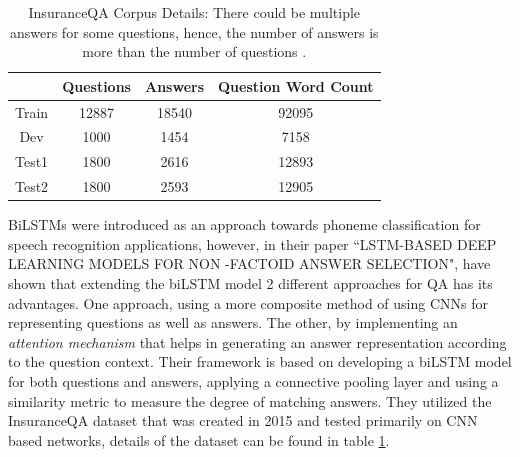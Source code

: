 \documentclass[a4paper,12pt]{report}
\begin{document}
             \begin{table}[h!]
              \centering
                \begin{tabular}{|c|c|c|c|}
                    \hline
                     & Questions & Answers & Question Word Count \\
                    \hline
                    Train & 12887 & 18540 & 92095 \\
                    \hline
                    Dev & 1000 & 1454& 7158 \\
                    \hline
                    Test1 & 1800 & 2616 & 12893 \\
                    \hline
                    Test2 & 1800 & 2593 & 12905 \\
                    \hline
                \end{tabular}
                \caption{InsuranceQA Corpus Details: There could be multiple answers for some questions, hence, the number of answers is more than the number of questions \citep{lstmInsuranceQA}.}\label{lstmInsuranceQATable}
            \end{table}

            BiLSTMs were introduced as an approach towards phoneme classification for speech recognition applications, however, in their paper ``LSTM-BASED DEEP LEARNING MODELS FOR NON -FACTOID ANSWER SELECTION", \citep{lstmhaighextractive} have shown that extending the biLSTM model 2 different approaches for QA has its advantages. One approach, using a more composite method of using CNNs for representing questions as well as answers. The other, by implementing an \textit{attention mechanism} that helps in generating an answer representation according to the question context.
            Their framework is based on developing a biLSTM model for both questions and answers, applying a connective pooling layer and using a similarity metric to measure the degree of matching answers. They utilized the InsuranceQA\citep{lstmInsuranceQA} dataset that was created in 2015 and tested primarily on CNN based networks, details of the dataset can be found in table \ref{lstmInsuranceQATable}.
\end{document}
